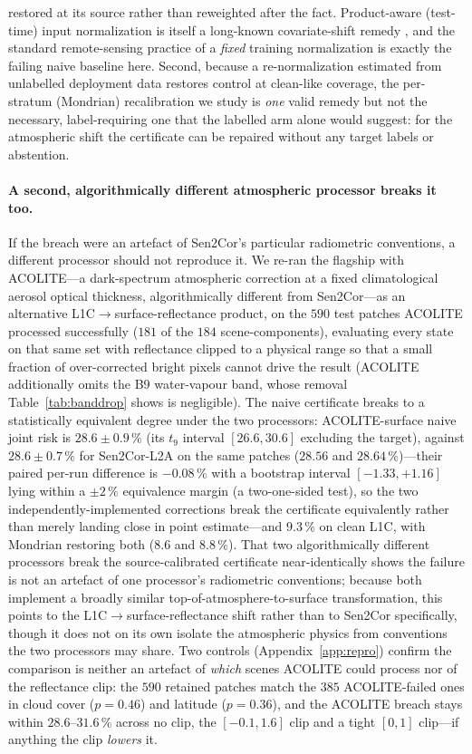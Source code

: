\documentclass[preprint,3p,times]{elsarticle}
\begin{document}
restored at its source rather than reweighted after the fact. Product-aware (test-time) input normalization is itself a long-known covariate-shift remedy \citep{adabn2016,schneider2020,nado2020,benz2021}, and the standard remote-sensing practice of a \emph{fixed} training normalization \citep{corley2024} is exactly the failing naive baseline here. Second, because a re-normalization estimated from unlabelled deployment data restores control at clean-like coverage, the per-stratum (Mondrian) recalibration we study is \emph{one} valid remedy but not the necessary, label-requiring one that the labelled arm alone would suggest: for the atmospheric shift the certificate can be repaired without any target labels or abstention.

\paragraph{A second, algorithmically different atmospheric processor breaks it too.} If the breach were an artefact of Sen2Cor's particular radiometric conventions, a different processor should not reproduce it. We re-ran the flagship with ACOLITE---a dark-spectrum atmospheric correction at a fixed climatological aerosol optical thickness, algorithmically different from Sen2Cor---as an alternative L1C$\to$surface-reflectance product, on the $590$ test patches ACOLITE processed successfully ($181$ of the $184$ scene-components), evaluating every state on that same set with reflectance clipped to a physical range so that a small fraction of over-corrected bright pixels cannot drive the result (ACOLITE additionally omits the B9 water-vapour band, whose removal Table~\ref{tab:banddrop} shows is negligible). The naive certificate breaks to a statistically equivalent degree under the two processors: ACOLITE-surface naive joint risk is $28.6 \pm 0.9\,\%$ (its $t_9$ interval $[26.6, 30.6]$ excluding the target), against $28.6 \pm 0.7\,\%$ for Sen2Cor-L2A on the same patches ($28.56$ and $28.64\,\%$)---their paired per-run difference is $-0.08\,\%$ with a bootstrap interval $[-1.33, +1.16]$ lying within a $\pm 2\,\%$ equivalence margin (a two-one-sided test), so the two independently-implemented corrections break the certificate equivalently rather than merely landing close in point estimate---and $9.3\,\%$ on clean L1C, with Mondrian restoring both ($8.6$ and $8.8\,\%$). That two algorithmically different processors break the source-calibrated certificate near-identically shows the failure is not an artefact of one processor's radiometric conventions; because both implement a broadly similar top-of-atmosphere-to-surface transformation, this points to the L1C$\to$surface-reflectance shift rather than to Sen2Cor specifically, though it does not on its own isolate the atmospheric physics from conventions the two processors may share. Two controls (Appendix~\ref{app:repro}) confirm the comparison is neither an artefact of \emph{which} scenes ACOLITE could process nor of the reflectance clip: the $590$ retained patches match the $385$ ACOLITE-failed ones in cloud cover ($p=0.46$) and latitude ($p=0.36$), and the ACOLITE breach stays within $28.6$--$31.6\,\%$ across no clip, the $[-0.1,1.6]$ clip and a tight $[0,1]$ clip---if anything the clip \emph{lowers} it.
\end{document}
